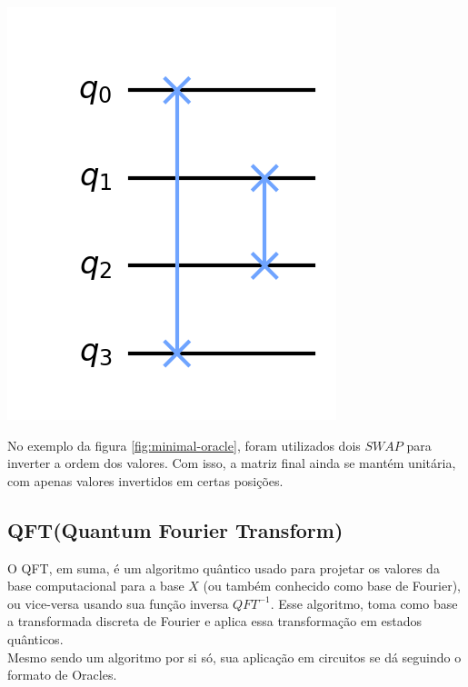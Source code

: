 \documentclass{article}
\begin{document}
\begin{center}
	\includegraphics[scale=0.3]{minimal-oracle.png}
	\label{fig:minimal-oracle}
\end{center}

No exemplo da figura \ref{fig:minimal-oracle}, foram utilizados dois $SWAP$ para inverter a ordem dos valores. Com isso, a matriz final ainda se mantém unitária, com apenas valores invertidos em certas posições.


\subsection{QFT(Quantum Fourier Transform)}

O QFT, em suma, é um algoritmo quântico usado para projetar os valores da base computacional para a base $X$ (ou também conhecido como base de Fourier), ou vice-versa usando sua função inversa $QFT^{-1}$. Esse algoritmo, toma como base a transformada discreta de Fourier e aplica essa transformação em estados quânticos.\\
Mesmo sendo um algoritmo por si só, sua aplicação em circuitos se dá seguindo o formato de Oracles.
\end{document}
